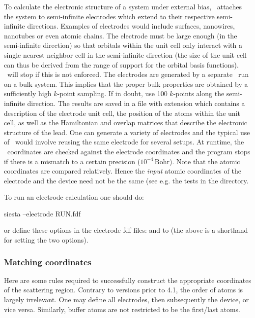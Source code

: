 To calculate the electronic structure of a system under external bias,
\tsiesta\ attaches the system to semi-infinite electrodes which extend
to their respective semi-infinite directions. Examples of electrodes
would include surfaces, nanowires, nanotubes or even atomic
chains. The electrode must be large enough (in the semi-infinite
direction) so that orbitals within the unit cell only interact with a
single nearest neighbor cell in the semi-infinite direction (the size
of the unit cell can thus be derived from the range of support for the
orbital basis functions). \tsiesta\ will stop if this is not
enforced. The electrodes are generated by a separate \tsiesta\ run on
a bulk system. This implies that the proper bulk properties are
obtained by a sufficiently high $k$-point sampling. If in doubt, use
100 $k$-points along the semi-infinite direction. The results are
saved in a file with extension  which contains a
description of the electrode unit cell, the position of the atoms
within the unit cell, as well as the Hamiltonian and overlap matrices
that describe the electronic structure of the lead. One can generate a
variety of electrodes and the typical use of \tsiesta\ would involve
reusing the same electrode for several setups. At runtime, the
\tsiesta\ coordinates are checked against the electrode coordinates
and the program stops if there is a mismatch to a certain precision
($10^{-4}\,\mathrm{Bohr}$). Note that the atomic coordinates are
compared relatively. Hence the \emph{input} atomic coordinates of the
electrode and the device need not be the same (see e.g. the tests in
the  directory.

To run an electrode calculation one should do:
\begin{shellexample}
  siesta --electrode RUN.fdf
\end{shellexample}
or define these options in the electrode fdf files:
 and  to  (the above
 is a shorthand for setting the two options).

\subsubsection{Matching coordinates}

Here are some rules required to successfully construct the appropriate
coordinates of the scattering region. Contrary to versions prior to
4.1, the order of atoms is largely irrelevant. One may define all
electrodes, then subsequently the device, or vice versa. Similarly,
buffer atoms are not restricted to be the first/last atoms.

